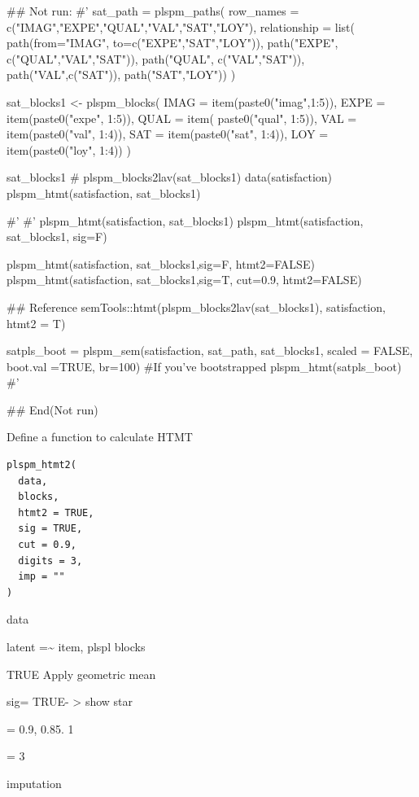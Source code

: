 \documentclass[a4paper]{book}
\begin{document}
\begin{Examples}
\begin{ExampleCode}
\#\# Not run: 
#'
sat_path = plspm_paths(
row_names = c("IMAG","EXPE","QUAL","VAL","SAT","LOY"),
relationship = list(
  path(from="IMAG", to=c("EXPE","SAT","LOY")),
  path("EXPE", c("QUAL","VAL","SAT")),
  path("QUAL", c("VAL","SAT")),
  path("VAL",c("SAT")),
  path("SAT","LOY"))
)

sat_blocks1 <- plspm_blocks(
  IMAG = item(paste0("imag",1:5)),
  EXPE = item(paste0("expe", 1:5)),
  QUAL = item( paste0("qual", 1:5)),
  VAL = item(paste0("val", 1:4)),
  SAT = item(paste0("sat", 1:4)),
  LOY = item(paste0("loy", 1:4))
)

sat_blocks1
# plspm_blocks2lav(sat_blocks1) %
data(satisfaction)
plspm_htmt(satisfaction, sat_blocks1)

#'
#'
plspm_htmt(satisfaction, sat_blocks1)
plspm_htmt(satisfaction, sat_blocks1, sig=F)

plspm_htmt(satisfaction, sat_blocks1,sig=F, htmt2=FALSE)
plspm_htmt(satisfaction, sat_blocks1,sig=T, cut=0.9, htmt2=FALSE)

## Reference
semTools::htmt(plspm_blocks2lav(sat_blocks1),
               satisfaction,
               htmt2 = T)

 satpls_boot = plspm_sem(satisfaction, sat_path, sat_blocks1,
  scaled = FALSE, boot.val =TRUE, br=100)
 #If you've bootstrapped
 plspm_htmt(satpls_boot)
#'


## End(Not run)



\end{ExampleCode}
\end{Examples}
%
\begin{Description}
Define a function to calculate HTMT
\end{Description}
%
\begin{Usage}
\begin{verbatim}
plspm_htmt2(
  data,
  blocks,
  htmt2 = TRUE,
  sig = TRUE,
  cut = 0.9,
  digits = 3,
  imp = ""
)
\end{verbatim}
\end{Usage}
%
\begin{Arguments}
\begin{ldescription}
\item[\code{data}] data

\item[\code{blocks}] latent =\textasciitilde{} item, plspl blocks

\item[\code{htmt2}] TRUE Apply geometric mean

\item[\code{sig}] sig= TRUE- > show star

\item[\code{cut}] = 0.9, 0.85. 1

\item[\code{digits}] = 3

\item[\code{imp}] imputation
\end{ldescription}
\end{Arguments}
\end{document}
